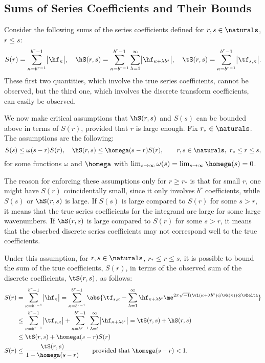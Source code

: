 \documentclass[]{elsarticle}
\theoremstyle{definition}
\begin{document}
\subsection{Sums of Series Coefficients and Their Bounds}
Consider the following sums of the series coefficients defined for $r,s \in \naturals$, $r \le s$:
\begin{equation}
S(r) =  \sum_{\kappa=b^{r-1}}^{b^{r}-1} \bigl \lvert \hf_{\kappa} \bigr \rvert, \quad 
\hS(r,s)  = \sum_{\kappa=b^{r-1}}^{b^{r}-1} \sum_{\lambda=1}^{\infty} \bigl \lvert \hf_{\kappa+\lambda b^{s}}\bigr\rvert, \quad 
\tS(r,s) = \sum_{\kappa=b^{r-1}}^{b^{r}-1} \bigl \lvert \tf_{s,\kappa}\bigr\rvert.
\end{equation}
These first two quantities, which involve the true series coefficients, cannot be observed, but the third one, which involves the discrete transform coefficients, can easily be observed.

We now make critical assumptions that $\hS(r,s)$ and $S(s)$ can be bounded above in terms of $S(r)$, provided that $r$ is large enough.  Fix $r_* \in \naturals$.  The assumptions are the following:
\begin{equation}
S(s) \le \omega(s-r) S(r), \quad \hS(r,s) \le \homega(s-r) S(r), \qquad r,s \in \naturals, \ r_* \le r \le s,
\end{equation}
for some functions $\omega$ and $\homega$ with $\lim_{s \to \infty} \omega(s) = \lim_{s \to \infty} \homega(s) = 0$.  

The reason for enforcing these assumptions only  for $r \ge r_*$ is that for small $r$, one might have $S(r)$ coincidentally small, since it only involves $b^r$ coefficients, while $S(s)$ or $\hS(r,s)$ is large.  If $S(s)$ is large compared to $S(r)$ for some $s > r$, it means that the true series coefficients for the integrand are large for some large wavenumbers.  If $\hS(r,s)$ is large compared to $S(r)$ for some $s > r$, it means that the obserbed discrete series coefficients may not correspond well to the true coefficients.

Under this assumption, for $r, s \in \naturals$, $r_* \le r \le s$, it is possible to bound the sum of the true coefficients, $S(r)$, in terms of the observed sum of the discrete coefficients, $\tS(r,s)$, as follows:
\begin{align*}
S(r) &= \sum_{\kappa=b^{r-1}}^{b^{r}-1} \bigl \lvert \hf_{\kappa}\bigr\rvert= \sum_{\kappa=b^{r-1}}^{b^{r}-1} \abs{\tf_{s,\kappa} - \sum_{\lambda=1}^{\infty} \hf_{\kappa+\lambda b^{s}} \me^{2 \pi \sqrt{-1} (\vl(\kappa+\lambda b^{s}) \ominus \vk(\kappa)) \otimes \vDelta}}\\
&\le \sum_{\kappa=b^{r-1}}^{b^{r}-1} \bigl \lvert \tf_{s,\kappa} \bigr\rvert + \sum_{\kappa=b^{r-1}}^{b^{r}-1} \sum_{\lambda=1}^{\infty} \bigl \lvert \hf_{\kappa+\lambda b^{s}}\bigr\rvert = \tS(r,s) + \hS(r,s) \\
&\le \tS(r,s) + \homega(s-r) S(r) \\
S(r) & \le \frac{\tS(r,s)}{1 - \homega(s-r)} \qquad \text{provided that } \homega(s-r) < 1.
\end{align*}
\end{document}
